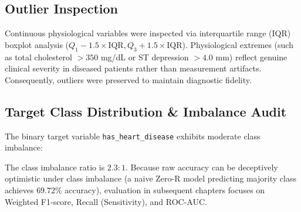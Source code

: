 \subsection{Outlier Inspection}
Continuous physiological variables were inspected via interquartile range (IQR) boxplot analysis ($Q_1 - 1.5\times\text{IQR}, Q_3 + 1.5\times\text{IQR}$). Physiological extremes (such as total cholesterol $>350$ mg/dL or ST depression $>4.0$ mm) reflect genuine clinical severity in diseased patients rather than measurement artifacts. Consequently, outliers were preserved to maintain diagnostic fidelity.

\subsection{Target Class Distribution \& Imbalance Audit}
The binary target variable \texttt{has\_heart\_disease} exhibits moderate class imbalance:
The class imbalance ratio is $2.3:1$. Because raw accuracy can be deceptively optimistic under class imbalance (a naive Zero-R model predicting majority class achieves $69.72\%$ accuracy), evaluation in subsequent chapters focuses on Weighted F1-score, Recall (Sensitivity), and ROC-AUC.
